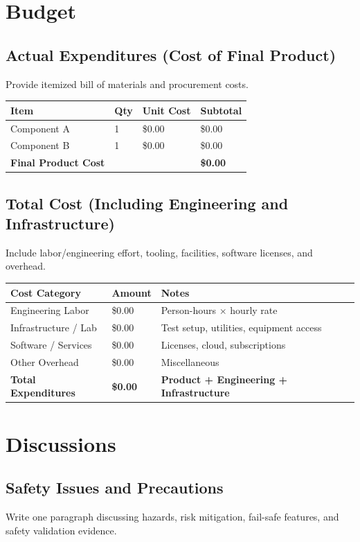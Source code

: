 \documentclass[12pt,a4paper]{report}
\begin{document}
\chapter{Budget}

\section{Actual Expenditures (Cost of Final Product)}
Provide itemized bill of materials and procurement costs.

\begin{longtable}{p{6cm}p{2cm}p{2cm}p{3cm}}
\toprule
Item & Qty & Unit Cost & Subtotal \\
\midrule
Component A & 1 & \$0.00 & \$0.00 \\
Component B & 1 & \$0.00 & \$0.00 \\
\midrule
\textbf{Final Product Cost} & & & \textbf{\$0.00} \\
\bottomrule
\end{longtable}

\section{Total Cost (Including Engineering and Infrastructure)}
Include labor/engineering effort, tooling, facilities, software licenses, and overhead.

\begin{longtable}{p{6cm}p{2cm}p{5cm}}
\toprule
Cost Category & Amount & Notes \\
\midrule
Engineering Labor & \$0.00 & Person-hours $\times$ hourly rate \\
Infrastructure / Lab & \$0.00 & Test setup, utilities, equipment access \\
Software / Services & \$0.00 & Licenses, cloud, subscriptions \\
Other Overhead & \$0.00 & Miscellaneous \\
\midrule
\textbf{Total Expenditures} & \textbf{\$0.00} & \textbf{Product + Engineering + Infrastructure} \\
\bottomrule
\end{longtable}

\chapter{Discussions}

\section{Safety Issues and Precautions}
Write one paragraph discussing hazards, risk mitigation, fail-safe features, and safety validation evidence.
\end{document}
